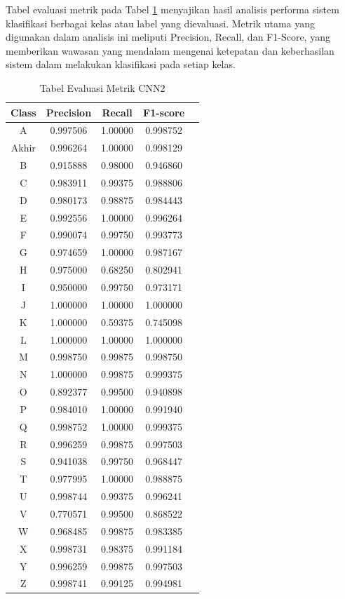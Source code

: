Tabel evaluasi metrik pada Tabel \ref{tab:tabelevaluasicnn2} menyajikan hasil analisis performa sistem klasifikasi  berbagai kelas atau label yang dievaluasi. Metrik utama yang digunakan dalam analisis ini meliputi Precision, Recall, dan F1-Score, yang memberikan wawasan yang mendalam mengenai ketepatan dan keberhasilan sistem dalam melakukan klasifikasi pada setiap kelas.
\begin{table}[h]
	\centering
	\caption{Tabel Evaluasi Metrik CNN2}
	\begin{tabular}{|c|c|c|c|c|}
	\hline
	Class & Precision & Recall & F1-score \\
    \hline
	A & 0.997506 & 1.00000 & 0.998752 \\
	Akhir & 0.996264 & 1.00000 & 0.998129 \\
	B & 0.915888 & 0.98000 & 0.946860 \\
	C & 0.983911 & 0.99375 & 0.988806 \\
	D & 0.980173 & 0.98875 & 0.984443 \\
	E & 0.992556 & 1.00000 & 0.996264 \\
	F & 0.990074 & 0.99750 & 0.993773 \\
	G & 0.974659 & 1.00000 & 0.987167 \\
	H & 0.975000 & 0.68250 & 0.802941 \\
	I & 0.950000 & 0.99750 & 0.973171 \\
	J & 1.000000 & 1.00000 & 1.000000 \\
	K & 1.000000 & 0.59375 & 0.745098 \\
	L & 1.000000 & 1.00000 & 1.000000 \\
	M & 0.998750 & 0.99875 & 0.998750 \\
	N & 1.000000 & 0.99875 & 0.999375 \\
	O & 0.892377 & 0.99500 & 0.940898 \\
	P & 0.984010 & 1.00000 & 0.991940 \\
	Q & 0.998752 & 1.00000 & 0.999375 \\
	R & 0.996259 & 0.99875 & 0.997503 \\
	S & 0.941038 & 0.99750 & 0.968447 \\
	T & 0.977995 & 1.00000 & 0.988875 \\
	U & 0.998744 & 0.99375 & 0.996241 \\
	V & 0.770571 & 0.99500 & 0.868522 \\
	W & 0.968485 & 0.99875 & 0.983385 \\
	X & 0.998731 & 0.98375 & 0.991184 \\
	Y & 0.996259 & 0.99875 & 0.997503 \\
	Z & 0.998741 & 0.99125 & 0.994981 \\
	\hline
	\end{tabular}
	\label{tab:tabelevaluasicnn2}
	\end{table}
